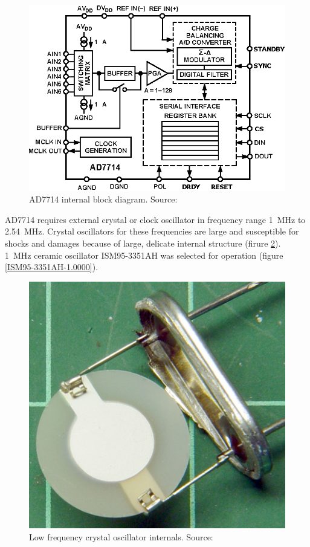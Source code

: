         \begin{figure}[H]
            \centering
            \includegraphics[width=0.5\paperwidth]{img/06/AD7714.eps}
            \caption{AD7714 internal block diagram. Source: \cite{AD7714_datasheet}}
            \label{AD7714}
        \end{figure}

        AD7714 requires external crystal or clock oscillator in frequency range \SI{1}{\mega\hertz} to \SI{2.54}{\mega\hertz}. Crystal oscillators for these frequencies are large and susceptible for shocks and damages because of large, delicate internal structure (firure \ref{Opening_a_Quartz_Crystal_Can_Effects_Thereof}). \SI{1}{\mega\hertz} ceramic oscillator ISM95-3351AH was selected for operation (figure \ref{ISM95-3351AH-1.0000}).

        \begin{figure}[H]
            \centering
            \includegraphics[width=0.5\paperwidth]{img/06/crystal.png}
            \caption{Low frequency crystal oscillator internals. Source: \cite{Opening_a_Quartz_Crystal_Can_Effects_Thereof}}
            \label{Opening_a_Quartz_Crystal_Can_Effects_Thereof}
        \end{figure}

